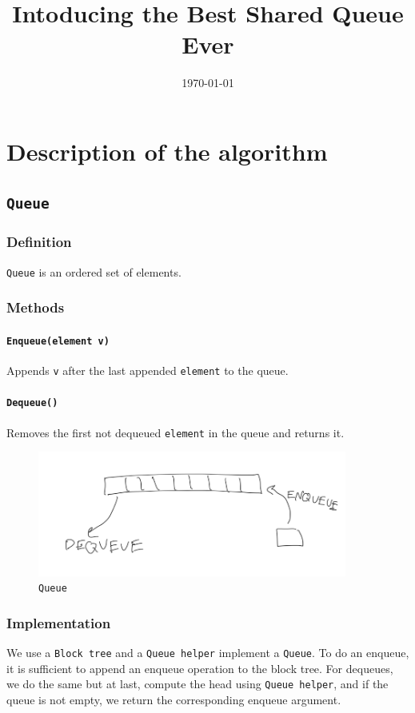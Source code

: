 \documentclass[12pt]{article}
\title{Intoducing the Best Shared Queue Ever}
\date{\today}
\begin{document}
\maketitle

\section{Description of the algorithm}


\subsection{\texttt{Queue}}
\subsubsection{Definition}
\texttt{Queue} is an ordered set of elements.\subsubsection{Methods}
\paragraph{\texttt{Enqueue(element v)}}
Appends \texttt{v} after the last appended \texttt{element} to the queue.
\paragraph{\texttt{Dequeue()}}
Removes the first not dequeued \texttt{element} in the queue and returns it.
\begin{figure}[hbt]
  \center\includegraphics[width=4in]{pics/queue}
  \caption{\texttt{Queue}}
\end{figure}
\subsubsection{Implementation}
 We use a \texttt{Block tree} and a \texttt{Queue helper} implement a \texttt{Queue}. To do an enqueue, it is sufficient to append an enqueue operation to the block tree. For dequeues, we do the same but at last, compute the head using \texttt{Queue helper}, and if the queue is not empty, we return the corresponding enqueue argument.
\end{document}

